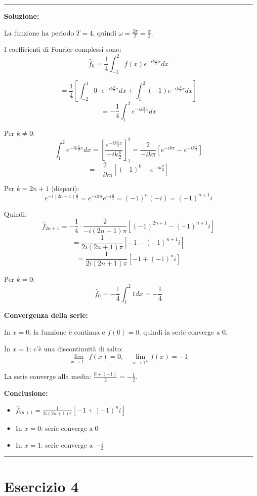 \documentclass[12pt, a4paper]{article}
\newenvironment{solution}
{\par\noindent\rule{\textwidth}{0.4pt}\par\textbf{Soluzione:}\medskip\par}
{\par\rule{\textwidth}{0.4pt}\par\bigskip}
\begin{document}
\begin{solution}
La funzione ha periodo $T = 4$, quindi $\omega = \frac{2\pi}{T} = \frac{\pi}{2}$.

I coefficienti di Fourier complessi sono:
\[
\hat{f}_k = \frac{1}{4} \int_{-2}^{2} f(x) e^{-i k \frac{\pi}{2} x} dx
\]

\[
= \frac{1}{4} \left[\int_{-2}^{1} 0 \cdot e^{-i k \frac{\pi}{2} x} dx + \int_{1}^{2} (-1) e^{-i k \frac{\pi}{2} x} dx\right]
\]
\[
= -\frac{1}{4} \int_{1}^{2} e^{-i k \frac{\pi}{2} x} dx
\]

Per $k \neq 0$:
\[
\int_{1}^{2} e^{-i k \frac{\pi}{2} x} dx = \left[\frac{e^{-i k \frac{\pi}{2} x}}{-i k \frac{\pi}{2}}\right]_{1}^{2} = \frac{2}{-i k \pi}\left[e^{-i k \pi} - e^{-i k \frac{\pi}{2}}\right]
\]
\[
= \frac{2}{-i k \pi}\left[(-1)^k - e^{-i k \frac{\pi}{2}}\right]
\]

Per $k = 2n+1$ (dispari):
\[
e^{-i (2n+1) \frac{\pi}{2}} = e^{-i \pi n} e^{-i \frac{\pi}{2}} = (-1)^n (-i) = (-1)^{n+1} i
\]

Quindi:
\[
\hat{f}_{2n+1} = -\frac{1}{4} \cdot \frac{2}{-i (2n+1) \pi}\left[(-1)^{2n+1} - (-1)^{n+1} i\right]
\]
\[
= \frac{1}{2i (2n+1) \pi}\left[-1 - (-1)^{n+1} i\right]
\]
\[
= \frac{1}{2i (2n+1) \pi}\left[-1 + (-1)^{n} i\right]
\]

Per $k = 0$:
\[
\hat{f}_0 = -\frac{1}{4} \int_{1}^{2} 1 dx = -\frac{1}{4}
\]

\textbf{Convergenza della serie:}

In $x = 0$: la funzione è continua e $f(0) = 0$, quindi la serie converge a 0.

In $x = 1$: c'è una discontinuità di salto:
\[
\lim_{x \to 1^-} f(x) = 0, \quad \lim_{x \to 1^+} f(x) = -1
\]

La serie converge alla media: $\frac{0 + (-1)}{2} = -\frac{1}{2}$.

\textbf{Conclusione:}
\begin{itemize}
    \item $\hat{f}_{2n+1} = \frac{1}{2i (2n+1) \pi}\left[-1 + (-1)^{n} i\right]$
    \item In $x = 0$: serie converge a 0
    \item In $x = 1$: serie converge a $-\frac{1}{2}$
\end{itemize}
\end{solution}

\newpage

\section*{Esercizio 4}
\end{document}
